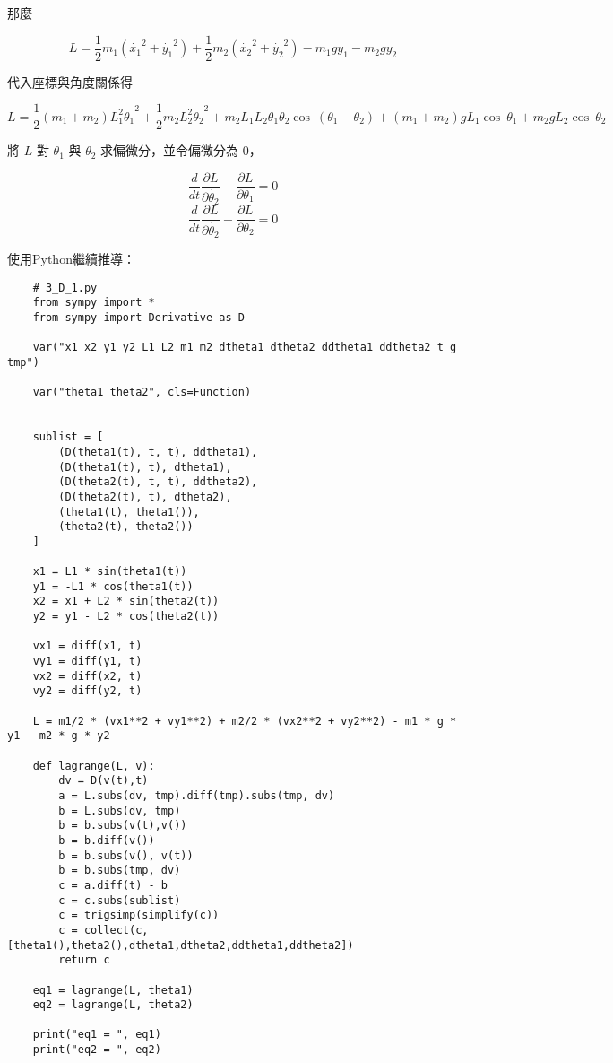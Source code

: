 \documentclass[UTF8,a4paper,12pt]{article}
\begin{document}
那麼

$$L = \frac{1}{2}m_1(\dot{x_1}^2 + \dot{y_1}^2) + \frac{1}{2}m_2(\dot{x_2}^2 + \dot{y_2}^2)
- m_1gy_1 - m_2gy_2$$

代入座標與角度關係得

$$L = \frac{1}{2}(m_1+m_2)L_1^2\dot{\theta_1}^2 + \frac{1}{2}m_2L_2^2\dot{\theta_2}^2
+ m_2L_1L_2\dot{\theta_1}\dot{\theta_2}\cos\ (\theta_1 - \theta_2)
+ (m_1+m_2)gL_1\cos\ \theta_1 + m_2gL_2\cos\ \theta_2
$$

將 $L$ 對 $\theta_1$ 與 $\theta_2$ 求偏微分，並令偏微分為 $0$，

$$\frac{d}{dt}\frac{\partial L}{\partial \dot{\theta_2}} - \frac{\partial L}{\partial \theta_1} = 0$$
$$\frac{d}{dt}\frac{\partial L}{\partial \dot{\theta_2}} - \frac{\partial L}{\partial \theta_2} = 0$$

使用Python繼續推導：

\begin{lstlisting}
    # 3_D_1.py
    from sympy import *
    from sympy import Derivative as D
    
    var("x1 x2 y1 y2 L1 L2 m1 m2 dtheta1 dtheta2 ddtheta1 ddtheta2 t g tmp")
    
    var("theta1 theta2", cls=Function)
    
    
    sublist = [
        (D(theta1(t), t, t), ddtheta1),
        (D(theta1(t), t), dtheta1),
        (D(theta2(t), t, t), ddtheta2),
        (D(theta2(t), t), dtheta2),
        (theta1(t), theta1()),
        (theta2(t), theta2())
    ]
    
    x1 = L1 * sin(theta1(t))
    y1 = -L1 * cos(theta1(t))
    x2 = x1 + L2 * sin(theta2(t))
    y2 = y1 - L2 * cos(theta2(t))
    
    vx1 = diff(x1, t)
    vy1 = diff(y1, t)
    vx2 = diff(x2, t)
    vy2 = diff(y2, t)
    
    L = m1/2 * (vx1**2 + vy1**2) + m2/2 * (vx2**2 + vy2**2) - m1 * g * y1 - m2 * g * y2
    
    def lagrange(L, v):
        dv = D(v(t),t)
        a = L.subs(dv, tmp).diff(tmp).subs(tmp, dv)
        b = L.subs(dv, tmp)
        b = b.subs(v(t),v())
        b = b.diff(v())
        b = b.subs(v(), v(t))
        b = b.subs(tmp, dv)
        c = a.diff(t) - b
        c = c.subs(sublist)
        c = trigsimp(simplify(c))
        c = collect(c, [theta1(),theta2(),dtheta1,dtheta2,ddtheta1,ddtheta2])
        return c
    
    eq1 = lagrange(L, theta1)
    eq2 = lagrange(L, theta2)
    
    print("eq1 = ", eq1)
    print("eq2 = ", eq2)
\end{lstlisting}
\end{document}
